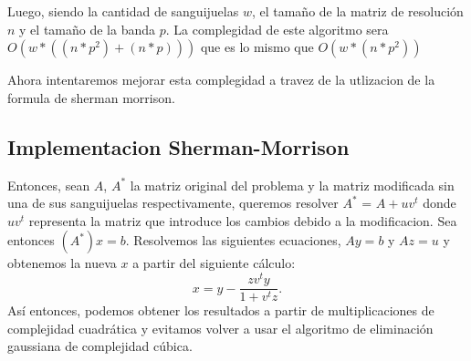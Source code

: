 Luego, siendo la cantidad de sanguijuelas $w$, el tamaño de la matriz de resoluci\'on $n$ y el tamaño de la banda $p$. La complegidad de este algoritmo sera $O(w*((n*p^2) + (n*p)) )$ que es lo mismo que $O(w*(n*p^2))$

Ahora intentaremos mejorar esta complegidad a travez de la utlizacion de la formula de sherman morrison.

\subsection{Implementacion Sherman-Morrison}


Entonces, sean $A$, $A^*$ la matriz original del problema y la matriz modificada sin una de sus sanguijuelas respectivamente, queremos resolver $A^*$ = $A + uv^t$ donde $uv^t$ representa la matriz que introduce los cambios debido a la modificacion. Sea entonces
$(A^*)x = b$. Resolvemos las siguientes ecuaciones, $Ay = b$ y $Az = u$ y obtenemos la nueva $x$ a partir del siguiente c\'alculo:
\begin{equation}
x = y - \frac{zv^ty}{1+v^tz}.
\end{equation}
As\'i entonces, podemos obtener los resultados a partir de multiplicaciones de complejidad cuadr\'atica y evitamos volver a usar el algoritmo de eliminaci\'on gaussiana de complejidad c\'ubica.

